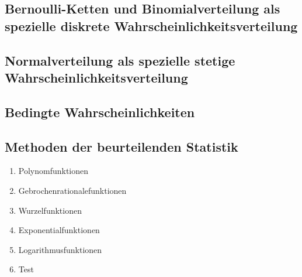 \documentclass{article}
\begin{document}
\subsection{Bernoulli-Ketten und Binomialverteilung als spezielle diskrete Wahrscheinlichkeitsverteilung}
\subsection{Normalverteilung als spezielle stetige Wahrscheinlichkeitsverteilung}
\subsection{Bedingte Wahrscheinlichkeiten}
\subsection{Methoden der beurteilenden Statistik}


\begin{enumerate}
    \item Polynomfunktionen
    \item Gebrochenrationalefunktionen
    \item Wurzelfunktionen
    \item Exponentialfunktionen
    \item Logarithmusfunktionen
    \item Test
\end{enumerate}
\end{document}
